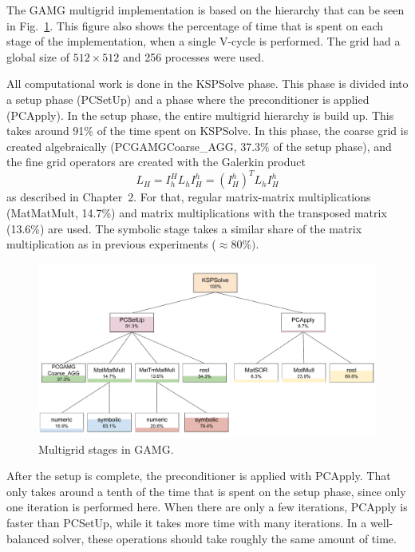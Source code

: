 The GAMG multigrid implementation is based on the hierarchy that can be seen in Fig.~\ref{fig:multigrid_hierarchy_gamg}. This figure also shows the percentage of time that is spent on each stage of the implementation, when a single V-cycle is performed. The grid had a global size of $512\times 512$ and 256 processes were used.

All computational work is done in the KSPSolve phase. This phase is divided into a setup phase (PCSetUp) and a phase where the preconditioner is applied (PCApply). In the setup phase, the entire multigrid hierarchy is build up. This takes around 91\% of the time spent on KSPSolve. In this phase, the coarse grid is created algebraically (PCGAMGCoarse\_AGG, 37.3\% of the setup phase), and the fine grid operators are created with the Galerkin product
\begin{equation}
L_H = I_h^H L_h I_H^h = (I_H^h)^T L_h I_H^h
\end{equation}
as described in Chapter~2. For that, regular matrix-matrix multiplications (MatMatMult, 14.7\%) and matrix multiplications with the transposed matrix (13.6\%) are used. The symbolic stage takes a similar share of the matrix multiplication as in previous experiments ($\approx 80\%)$.

\begin{figure}[tbp]
	\centering
	\hspace*{-7mm}\includegraphics[width=1.1\textwidth]{Multigrid_hierarchy_GAMG}
	\caption{Multigrid stages in GAMG.} 
	\label{fig:multigrid_hierarchy_gamg}
\end{figure}

After the setup is complete, the preconditioner is applied with PCApply. That only takes around a tenth of the time that is spent on the setup phase, since only one iteration is performed here. When there are only a few iterations, PCApply is faster than PCSetUp, while it takes more time with many iterations. In a well-balanced solver, these operations should take roughly the same amount of time. 

